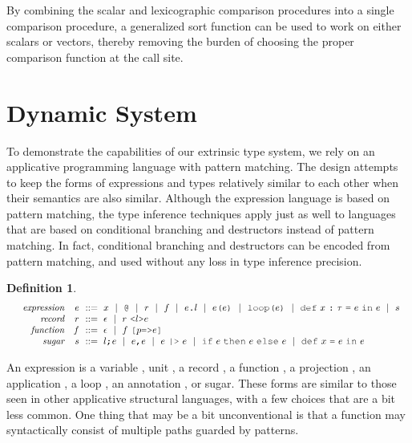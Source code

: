 \documentclass[acmsmall]{acmart}
\theoremstyle{definition}
\newtheorem{definition}{Definition}[section]
\begin{document}
\noindent
By combining the scalar and lexicographic comparison procedures into a single comparison
procedure, a generalized sort function can be used to work on either scalars or vectors,
thereby removing the burden of choosing the proper comparison function at the call site.  


\section{Dynamic System}
\label{sec:dynamic_system}

\noindent
To demonstrate the capabilities of our extrinsic type system, 
we rely on an applicative programming language with pattern matching.
The design attempts to keep the forms of expressions and types relatively 
similar to each other when their semantics are also similar. 
Although the expression language is based on pattern matching, 
the type inference techniques apply just as well to languages
that are based on conditional branching and destructors instead of pattern matching.
In fact, conditional branching and destructors can be encoded from pattern matching,
and used without any loss in type inference precision.

\begin{definition}
  \label{def:expression}
  \nopad 
  \small
  \[\begin{array}[t]{rr@{}l}
    \com{expression} &
    \nonterm{e} 
    & 
    \is 
    \begin{array}[t]{@{}l}
      x \sep 
      \J{@} \sep
      r \sep
      f \sep 
      e\J{.}l \sep
      e\J{(}e\J{)} \sep
      \J{loop(}e\J{)} \sep
      \J{def}\ x\ \J{:}\ \tau\ \J{=}\ e\ \J{in}\ e \sep
      s
    \end{array}
    \\
    \com{record} &
    \nonterm{r} & \is \epsilon \sep r\ \J{<}l\J{>}e 
    \\
    \com{function} &
    \nonterm{f} & \is \epsilon \sep f\ \J{[}p\J{=>}e \J{]}
    \\
    \com{sugar} &
    \nonterm{s} 
    & 
    \is 
    \begin{array}[t]{@{}l}
      l \J{;} e \sep
      e \J{,} e \sep
      e\ \J{|>}\ e \sep
      \J{if}\ e\ \J{then}\ e\ \J{else}\ e \sep
      \J{def}\ x\ \J{=}\ e\ \J{in}\ e
    \end{array}
  \end{array}\]
\end{definition}

\noindent
An expression is a variable , unit ,
a record , a function , 
a projection , an application , 
a loop ,
an annotation ,
or sugar.
These forms are similar to those seen in other applicative structural languages,
with a few choices that are a bit less common. One thing that may be
a bit unconventional is that a function may syntactically consist of 
multiple paths guarded by patterns.  
\end{document}
